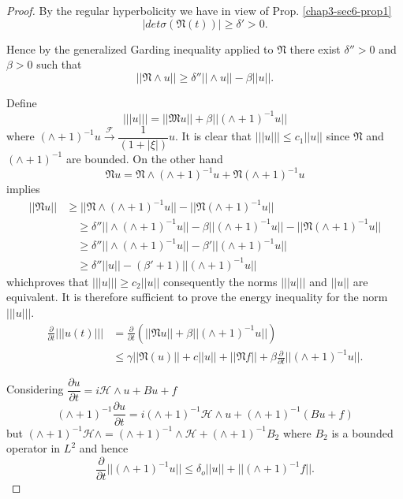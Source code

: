 \begin{proof}
By the regular hyperbolicity we have in view of Prop. \ref{chap3-sec6-prop1}
\begin{equation*}
|det \sigma (\mathfrak{N}(t))|\geq \delta' >
0. \tag{6.4}\label{addchap3-eq6.4}  
\end{equation*}

Hence by the generalized Garding inequality applied to $\mathfrak{N}$
there exist $\delta''> 0$ and $ \beta > 0$ such that 
\begin{equation}
|| \mathfrak{N}\wedge u|| \geq \delta'' || \wedge u||- \beta ||
u||. \tag{6.8}\label{chap3-eq6.8} 
\end{equation}

Define
\begin{equation*}
||| u ||| = || \mathfrak{M} u || + \beta || (\wedge + 1)^{-1} u ||
\tag{6.9} \label{chap3-eq6.9}
\end{equation*}
where $(\wedge+1)^{-1} u \xrightarrow{\mathscr{F}} \dfrac{1}{(1+|\xi|)}
\hat{u}$. It is clear that $||| u||| \leq c_{1}|| u||$ since
$\mathfrak{N}$ and $(\wedge + 1)^{-1}$  are bounded. On the other hand 
$$
\mathfrak{N} u = \mathfrak{N} \wedge (\wedge + 1)^{-1} u + \mathfrak{N}
(\wedge+1)^{-1}u 
$$
implies 
\begin{align*}
|| \mathfrak{N} u || &\geq || \mathfrak{N}\wedge (\wedge  + 1)^{-1} u||-||
\mathfrak{N}(\wedge + 1)^{-1} u||\\
&\quad \geq \delta'' || \wedge(\wedge + 1)^{-1} u|| -\beta ||(\wedge +
  1)^{-1}u|| -|| \mathfrak{N}(\wedge + 1)^{-1}u||\\ 
&\quad \geq \delta'' || \wedge(\wedge + 1)^{-1} u|| -\beta' ||(\wedge +
  1)^{-1}u|| \\ 
&\quad \geq \delta'' ||u|| -(\beta'+ 1)|| (\wedge + 1)^{-1}u|| 
\end{align*}
which\pageoriginale proves that $||| u ||| \geq c_2 || u|| $
consequently the norms $||| u||| $ and $|| u||$ are equivalent. It is
therefore sufficient to prove the energy inequality for the norm $|||
u |||$.  
\begin{align*}
\frac{\partial}{\partial t} ||| u(t)||| & = \frac{\partial}{\partial
  t}(|| \mathfrak{N} u || + \beta || (\wedge + 1)^{-1}u ||) \\
& \leq \gamma || \mathfrak{N} (u) ||+ c || u|| +|| \mathfrak{N} f|| +\beta
\frac{\partial}{\partial t}|| (\wedge+1)^{-1}u
||. \tag{6.10}\label{chap3-eq6.10}  
\end{align*}

Considering $\dfrac{\partial u}{\partial t} = i \mathscr{H}\wedge u +
Bu + f$ 
$$
(\wedge + 1)^{-1} \frac{\partial u}{\partial t} = i(\wedge +
1)^{-1}\mathscr{H} \wedge u + (\wedge + 1)^{-1}(Bu + f) 
$$
but $(\wedge + 1)^{-1}\mathscr{H} \wedge = (\wedge+1)^{-1} \wedge
\mathscr{H}  + (\wedge+1)^{-1}B_{2}$  
where $B_{2}$ is a bounded operator in $L^{2}$ and hence
$$
\frac{\partial}{\partial t}||(\wedge + 1)^{-1}u|| \leq \delta_{o} ||u
|| +|| (\wedge + 1)^{-1}f ||. 
$$


\end{proof}
